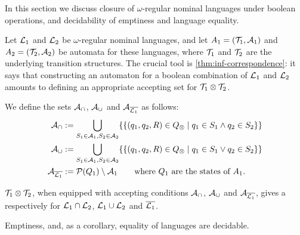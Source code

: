 \newcommand{\compl}[1]{\overline{#1}}
 
In this section we discuss closure of $\omega$-regular nominal languages under boolean operations, and decidability of emptiness and language equality.

Let $\mathcal{L}_1$ and $\mathcal{L}_2$ be $\omega$-regular nominal languages, and let $A_1 = (\mathcal{T}_1,\mathcal{A}_1)$  and $A_2 = (\mathcal{T}_2,\mathcal{A}_2)$ be automata for these languages, where $\mathcal{T}_1$ and $\mathcal{T}_2$ are the underlying transition structures.
The crucial tool is \cref{thm:inf-correspondence}: it says that constructing an automaton for a boolean combination of $\mathcal{L}_1$ and $\mathcal{L}_2$ amounts to defining an appropriate accepting set for $\mathcal{T}_1 \otimes \mathcal{T}_2$.

\begin{definition} We define the sets $\mathcal{A}_\cap$, $\mathcal{A}_\cup$ and $\acc_{\compl{\Lang_1}}$ as follows:
%
\begin{align*}
	\acc_\cap &:= \bigcup_{S_1 \in \acc_1,S_2 \in \acc_2 } \{\{ (q_1,q_2,R) \in \syncQ \mid q_1 \in S_1 \land q_2 \in S_2 \}\} 
	\\
	\acc_\cup &:= \bigcup_{S_1 \in \acc_1,S_2 \in \acc_2 } \{\{(q_1,q_2,R) \in \syncQ \mid q_1 \in S_1 \lor q_2 \in S_2 \}\} 
	\\
	\acc_{\compl{\Lang_1}} &:= \Pow(Q_1) \setminus \acc_1 \qquad \text{where $Q_1$ are the states of $\autom_1$.}
\end{align*}
%
%
\end{definition}

\begin{theorem}
$\mathcal{T}_1 \otimes \mathcal{T}_2$, when equipped with accepting conditions $\mathcal{A}_\cap$, $\mathcal{A}_\cup$ and $\acc_{\compl{\Lang_1}}$, gives a \hdma{} respectively for $\mathcal{L}_1 \cap \mathcal{L}_2$, $\mathcal{L}_1 \cup \mathcal{L}_2$ and $\compl{\Lang_1}$.
\label{thm:bool-closure}
\end{theorem}
%
\begin{theorem}
\label{thm:decidable}
Emptiness, and, as a corollary, equality of languages are decidable.
\end{theorem}

